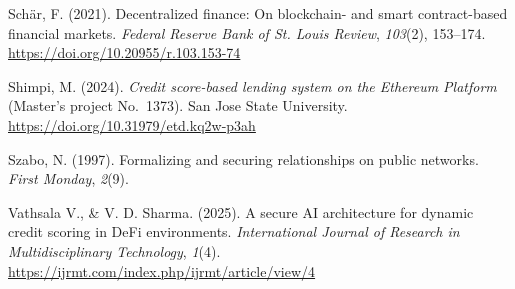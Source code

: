 \hangindent=0.5in  Sch\"{a}r, F. (2021). Decentralized finance: On blockchain- and smart contract-based financial markets. \textit{Federal Reserve Bank of St. Louis Review}, \textit{103}(2), 153--174. \href{https://doi.org/10.20955/r.103.153-74}{https://doi.org/10.20955/r.103.153-74}\par

\hangindent=0.5in  Shimpi, M. (2024). \textit{Credit score-based lending system on the Ethereum Platform} (Master's project No.\ 1373). San Jose State University. \href{https://doi.org/10.31979/etd.kq2w-p3ah}{https://doi.org/10.31979/etd.kq2w-p3ah}\par

\hangindent=0.5in  Szabo, N. (1997). Formalizing and securing relationships on public networks. \textit{First Monday}, \textit{2}(9).\par

\hangindent=0.5in  Vathsala V., \& V. D. Sharma. (2025). A secure AI architecture for dynamic credit scoring in DeFi environments. \textit{International Journal of Research in Multidisciplinary Technology}, \textit{1}(4). \href{https://ijrmt.com/index.php/ijrmt/article/view/4}{https://ijrmt.com/index.php/ijrmt/article/view/4}\par
